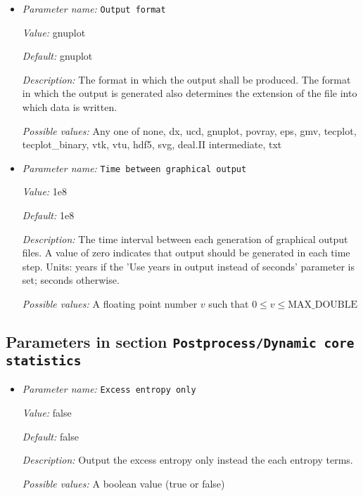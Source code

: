 \begin{itemize}
{\it Possible values:} An integer $n$ such that $1\leq n \leq 2147483647$
\item {\it Parameter name:} {\tt Output format}
\label{parameters:Postprocess/Depth average/Output format}


{\it Value:} gnuplot


{\it Default:} gnuplot


{\it Description:} The format in which the output shall be produced. The format in which the output is generated also determines the extension of the file into which data is written.


{\it Possible values:} Any one of none, dx, ucd, gnuplot, povray, eps, gmv, tecplot, tecplot\_binary, vtk, vtu, hdf5, svg, deal.II intermediate, txt
\item {\it Parameter name:} {\tt Time between graphical output}
\label{parameters:Postprocess/Depth average/Time between graphical output}


{\it Value:} 1e8


{\it Default:} 1e8


{\it Description:} The time interval between each generation of graphical output files. A value of zero indicates that output should be generated in each time step. Units: years if the 'Use years in output instead of seconds' parameter is set; seconds otherwise.


{\it Possible values:} A floating point number $v$ such that $0 \leq v \leq \text{MAX\_DOUBLE}$
\end{itemize}

\subsection{Parameters in section \tt Postprocess/Dynamic core statistics}
\label{parameters:Postprocess/Dynamic_20core_20statistics}

\begin{itemize}
\item {\it Parameter name:} {\tt Excess entropy only}
\label{parameters:Postprocess/Dynamic core statistics/Excess entropy only}


{\it Value:} false


{\it Default:} false


{\it Description:} Output the excess entropy only instead the each entropy terms.


{\it Possible values:} A boolean value (true or false)
\end{itemize}

